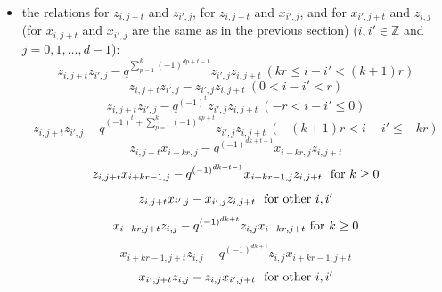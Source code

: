 \documentclass[reqno,12pt,a4paper]{amsart}
\theoremstyle{remark}
\theoremstyle{definition}
\numberwithin{equation}{section}
\begin{document}
\begin{itemize}
	
	\item[(3)] the relations for $z_{i,j+t}$ and $z_{i',j}$, for $z_{i,j+t}$ and $x_{i',j}$, and for $x_{i',j+t}$ and $z_{i,j}$ (for $x_{i,j+t}$ and $x_{i',j}$ are the same as in the previous section) ($i,i'\in\mathbb{Z}$ and $j=0,1,\ldots,d-1$):
	\begin{equation*}
		z_{i,j+t}z_{i',j}-q^{\sum\limits_{p=1}^{k}(-1)^{dp+t-1}}z_{i',j}z_{i,j+t}~(kr\leq i-i'<(k+1)r)
	\end{equation*}
	\begin{equation*}
		z_{i,j+t}z_{i',j}-z_{i',j}z_{i,j+t}~(0< i-i'<r)
	\end{equation*}
	\begin{equation*}
		z_{i,j+t}z_{i',j}-q^{(-1)^t}z_{i',j}z_{i,j+t}~(-r< i-i'\leq 0)
	\end{equation*}
	\begin{equation*}
		z_{i,j+t}z_{i',j}-q^{(-1)^t+\sum\limits_{p=1}^{k}(-1)^{dp+t}}z_{i',j}z_{i,j+t}~(-(k+1)r<i-i'\leq -kr)
	\end{equation*}
	\begin{equation*}
		z_{i,j+t}x_{i-kr,j}-q^{(-1)^{dk+t-1}}x_{i-kr,j}z_{i,j+t}
	\end{equation*}
	\begin{equation*}
		z_{i,j+t}x_{i+kr-1,j}-q^{(-1)^{dk+t-1}}x_{i+kr-1,j}z_{i,j+t}~\hbox{ for $k\geq 0$}
	\end{equation*}
	\begin{equation*}
		z_{i,j+t}x_{i',j}-x_{i',j}z_{i,j+t}~\hbox{ for other $i,i'$} 
	\end{equation*}
	\begin{equation*}
		x_{i-kr,j+t}z_{i,j}-q^{(-1)^{dk+t}}z_{i,j}x_{i-kr,j+t}~\hbox {for $k\geq 0$}
	\end{equation*}
	\begin{equation*}
		x_{i+kr-1,j+t}z_{i,j}-q^{(-1)^{dk+t}}z_{i,j}x_{i+kr-1,j+t}
	\end{equation*}
	\begin{equation*}
		x_{i',j+t}z_{i,j}-z_{i,j}x_{i',j+t}~\hbox{ for other $i,i'$} 
	\end{equation*}
\end{itemize}
\end{document}
